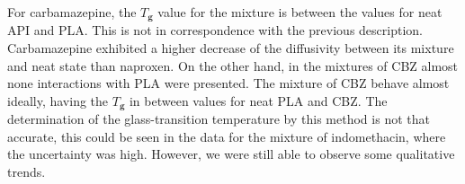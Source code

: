 For carbamazepine, the $T_\textbf{g}$ value for the mixture is between the values for neat API and PLA. This is not in correspondence with the previous description. Carbamazepine exhibited a higher decrease of the diffusivity between its mixture and neat state than naproxen. On the other hand, in the mixtures of CBZ almost none interactions with PLA were presented. The mixture of CBZ behave almost ideally, having the $T_\textbf{g}$ in between values for neat PLA and CBZ. The determination of the glass-transition temperature by this method is not that accurate, this could be seen in the data for the mixture of indomethacin, where the uncertainty was high. However, we were still able to observe some qualitative trends.
